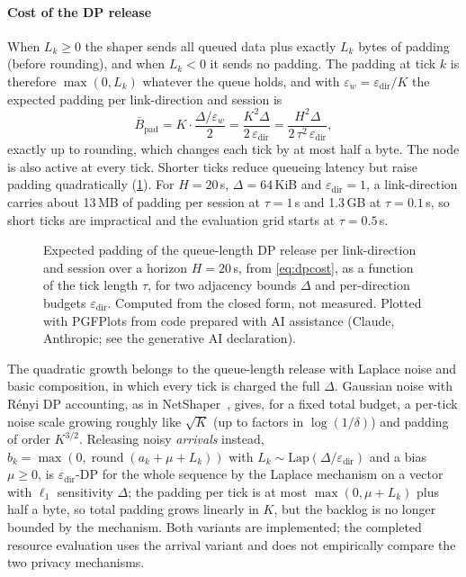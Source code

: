 \paragraph{Cost of the DP release} When $L_k\ge0$ the shaper sends all queued data plus exactly $L_k$ bytes of padding (before rounding), and when $L_k<0$ it sends no padding. The padding at tick $k$ is therefore $\max(0,L_k)$ whatever the queue holds, and with $\varepsilon_w=\varepsilon_{\mathrm{dir}}/K$ the expected padding per link-direction and session is
\begin{equation}\label{eq:dpcost}
\bar B_{\mathrm{pad}}=K\cdot\frac{\Delta/\varepsilon_w}{2}=\frac{K^2\Delta}{2\,\varepsilon_{\mathrm{dir}}}=\frac{H^2\Delta}{2\,\tau^2\,\varepsilon_{\mathrm{dir}}},
\end{equation}
exactly up to rounding, which changes each tick by at most half a byte. The node is also active at every tick. Shorter ticks reduce queueing latency but raise padding quadratically (\cref{fig:dpcost}). For $H=20$\,s, $\Delta=64$\,KiB and $\varepsilon_{\mathrm{dir}}=1$, a link-direction carries about 13\,MB of padding per session at $\tau=1$\,s and 1.3\,GB at $\tau=0.1$\,s, so short ticks are impractical and the evaluation grid starts at $\tau=0.5$\,s.

\begin{figure}[t]
\centering

\caption{Expected padding of the queue-length DP release per link-direction and session over a horizon $H=20$\,s, from \cref{eq:dpcost}, as a function of the tick length $\tau$, for two adjacency bounds $\Delta$ and per-direction budgets $\varepsilon_{\mathrm{dir}}$. Computed from the closed form, not measured. Plotted with PGFPlots from code prepared with AI assistance (Claude, Anthropic; see the generative AI declaration).}
\label{fig:dpcost}
\end{figure}

\begin{remark}\label{rem:exponent}
The quadratic growth belongs to the queue-length release with Laplace noise and basic composition, in which every tick is charged the full $\Delta$. Gaussian noise with R\'enyi DP accounting, as in NetShaper~\cite{sabzi2024netshaper}, gives, for a fixed total budget, a per-tick noise scale growing roughly like $\sqrt{K}$ (up to factors in $\log(1/\delta)$) and padding of order $K^{3/2}$. Releasing noisy \emph{arrivals} instead, $b_k=\max(0,\operatorname{round}(a_k+\mu+L_k))$ with $L_k\sim\mathrm{Lap}(\Delta/\varepsilon_{\mathrm{dir}})$ and a bias $\mu\ge0$, is $\varepsilon_{\mathrm{dir}}$-DP for the whole sequence by the Laplace mechanism on a vector with $\ell_1$ sensitivity $\Delta$; the padding per tick is at most $\max(0,\mu+L_k)$ plus half a byte, so total padding grows linearly in $K$, but the backlog is no longer bounded by the mechanism. Both variants are implemented; the completed resource evaluation uses the arrival variant and does not empirically compare the two privacy mechanisms.
\end{remark}

